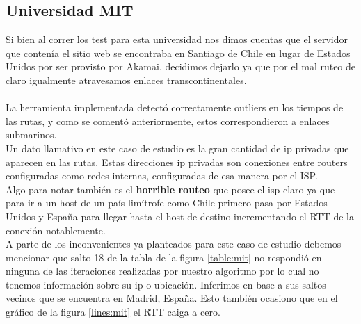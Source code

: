 \subsection{Universidad MIT}
Si bien al correr los test para esta universidad nos dimos cuentas que el servidor que contenía el sitio web se encontraba en Santiago de Chile en lugar de Estados Unidos por ser provisto por Akamai, decidimos dejarlo ya que por el mal ruteo de claro igualmente atravesamos enlaces transcontinentales.\\\\
La herramienta implementada detectó correctamente outliers en los tiempos de las rutas, y como se comentó anteriormente, estos correspondieron a enlaces submarinos.\\ 
Un dato llamativo en este caso de estudio es la gran cantidad de ip privadas que aparecen en las rutas. Estas direcciones ip privadas son conexiones entre routers configuradas como redes internas, configuradas de esa manera por el ISP.\\
Algo para notar también es el \textbf{horrible routeo} que posee el isp claro ya que para ir a un host de un país limítrofe como Chile primero pasa por Estados Unidos y España para llegar hasta el host de destino incrementando el RTT de la conexión notablemente.\\
A parte de los inconvenientes ya planteados para este caso de estudio debemos mencionar que salto 18 de la tabla de la figura \ref{table:mit} no respondió en ninguna de las iteraciones realizadas por nuestro algoritmo por lo cual no tenemos información sobre su ip o ubicación. Inferimos en base a sus saltos vecinos que se encuentra en Madrid, España. Esto también ocasiono que en el gráfico de la figura \ref{lines:mit} el RTT caiga a cero.

